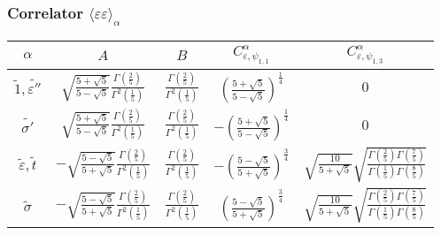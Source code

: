 \documentclass[a4paper,12pt]{report}
\begin{document}
\subsubsection{Correlator $\langle\varepsilon\varepsilon\rangle_{\alpha}$}
\begin{center}
\begin{tabular}{|c|c|c|c|c|}\hline
$\alpha$ &  $A$  & $ B$ & $ C_{\varepsilon,\psi_{1,1}}^{\alpha}$ & $ C_{\varepsilon,\psi_{1,3}}^{\alpha}$  \\
\hline

$\tilde{1}, \tilde{\varepsilon''}$ & $\sqrt{\frac{5+\sqrt{5}}{5-\sqrt{5}}}\frac{\Gamma \left(\frac{2}{5}
\right)}{\Gamma ^{2}\left(\frac{1}{5} \right)}$ &
$\frac{\Gamma \left(\frac{2}{5} \right)}{\Gamma ^{2}\left(\frac{1}{5} \right)}$& $\left(\frac{5+\sqrt{5}}{5-\sqrt{5}} \right)^{\frac{1}{4}}$ & $0$ \\

$\tilde{\sigma'}$ & $\sqrt{\frac{5+\sqrt{5}}{5-\sqrt{5}}}\frac{\Gamma \left(\frac{2}{5} \right)}{\Gamma
^{2}\left(\frac{1}{5} \right)}$ & $\frac{\Gamma \left(\frac{2}{5} \right)}{\Gamma ^{2}\left(\frac{1}{5}
\right)}$&  $-\left(\frac{5+\sqrt{5}}{5-\sqrt{5}} \right)^{\frac{1}{4}}$ & $0$ \\

$\tilde{\varepsilon}, \tilde{t}$ & $-\sqrt{\frac{5-\sqrt{5}}{5+\sqrt{5}}}\frac{\Gamma \left(\frac{2}{5}
\right)}{\Gamma ^{2}\left(\frac{1}{5} \right)}$ & $\frac{\Gamma \left(\frac{2}{5} \right)}{\Gamma ^{2}\left(\frac{1}{5} \right)}$&  $-\left(\frac{5-\sqrt{5}}{5+\sqrt{5}} \right)^{\frac{3}{4}}$ & $\sqrt{\frac{10}{5+\sqrt{5}}}\sqrt{\frac{\Gamma \left(\frac{2}{5} \right)\Gamma \left(\frac{7}{5} \right)}{\Gamma \left(\frac{1}{5} \right)\Gamma \left(\frac{8}{5} \right)}}$ \\

$\tilde{\sigma}$ & $-\sqrt{\frac{5-\sqrt{5}}{5+\sqrt{5}}}\frac{\Gamma \left(\frac{2}{5} \right)}{\Gamma
^{2}\left(\frac{1}{5} \right)}$ & $\frac{\Gamma \left(\frac{2}{5} \right)}{\Gamma ^{2}\left(\frac{1}{5}
\right)}$&  $\left(\frac{5-\sqrt{5}}{5+\sqrt{5}} \right)^{\frac{3}{4}}$ &
$\sqrt{\frac{10}{5+\sqrt{5}}}\sqrt{\frac{\Gamma \left(\frac{2}{5} \right)\Gamma \left(\frac{7}{5} \right)}{\Gamma
\left(\frac{1}{5} \right)\Gamma \left(\frac{8}{5} \right)}}$ \\ \hline
\end{tabular}
\end{center}
\end{document}
